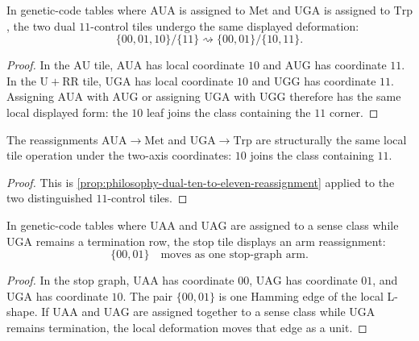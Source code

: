 \begin{proposition}
\label{prop:philosophy-dual-ten-to-eleven-reassignment}
In genetic-code tables where $\mathrm{AUA}$ is assigned to
$\mathrm{Met}$ and $\mathrm{UGA}$ is assigned to $\mathrm{Trp}$, the two
dual $11$-control tiles undergo the same displayed deformation:
$$
  \{00,01,10\}/\{11\}
  \rightsquigarrow
  \{00,01\}/\{10,11\}.
$$
\end{proposition}
\begin{proof}
In the $\mathrm{AU}$ tile, $\mathrm{AUA}$ has local coordinate $10$ and
$\mathrm{AUG}$ has coordinate $11$. In the $\mathrm{U}+\mathrm{RR}$ tile,
$\mathrm{UGA}$ has local coordinate $10$ and $\mathrm{UGG}$ has coordinate
$11$. Assigning $\mathrm{AUA}$ with $\mathrm{AUG}$ or assigning
$\mathrm{UGA}$ with $\mathrm{UGG}$ therefore has the same local displayed
form: the $10$ leaf joins the class containing the $11$ corner.
\end{proof}

\begin{corollary}
\label{cor:philosophy-aua-met-uga-trp-same-tile-form}
The reassignments $\mathrm{AUA}\to\mathrm{Met}$ and
$\mathrm{UGA}\to\mathrm{Trp}$ are structurally the same local tile
operation under the two-axis coordinates: $10$ joins the class containing
$11$.
\end{corollary}
\begin{proof}
This is \autoref{prop:philosophy-dual-ten-to-eleven-reassignment} applied
to the two distinguished $11$-control tiles.
\end{proof}

\begin{proposition}
\label{prop:philosophy-stop-arm-reassignment}
In genetic-code tables where $\mathrm{UAA}$ and $\mathrm{UAG}$ are
assigned to a sense class while $\mathrm{UGA}$ remains a termination row,
the stop tile displays an arm reassignment:
$$
  \{00,01\}\quad\text{moves as one stop-graph arm}.
$$
\end{proposition}
\begin{proof}
In the stop graph, $\mathrm{UAA}$ has coordinate $00$,
$\mathrm{UAG}$ has coordinate $01$, and $\mathrm{UGA}$ has coordinate
$10$. The pair $\{00,01\}$ is one Hamming edge of the local L-shape. If
$\mathrm{UAA}$ and $\mathrm{UAG}$ are assigned together to a sense class
while $\mathrm{UGA}$ remains termination, the local deformation moves that
edge as a unit.
\end{proof}

